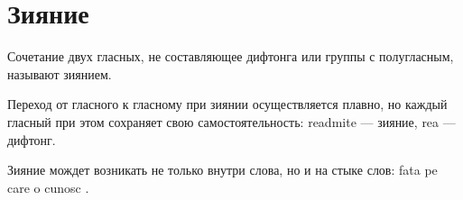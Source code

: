 \section{Зияние}

Сочетание двух гласных, не составляющее дифтонга или группы с полугласным, называют зиянием.

Переход от гласного к гласному при зиянии осуществляется плавно,
но каждый гласный при этом сохраняет свою самостоятельность:
readmite \textipa{[re-ad"mIte]} --- зияние, rea \textipa{[r\t*{ea}]} --- дифтонг.

Зияние мождет возникать не только внутри слова, но и на стыке слов:
fata pe care o cunosc \textipa{[e-o]}.
